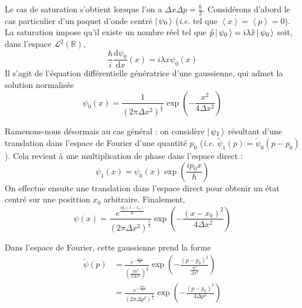         Le cas de saturation s’obtient lorsque l’on a $\Delta x \Delta p = \frac{\hbar}{2}$. Considérons d’abord le cas particulier d’un paquet d’onde centré $\left| \, \psi_0 \, \right>$ (\textit{i.e.} tel que $\left<x\right> = \left<p\right> = 0$). La saturation impose qu’il existe un nombre réel tel que $\hat{p} \left| \, \psi_0 \, \right> = i \lambda \hat{x} \left| \, \psi_0 \, \right>$ soit, dans l’espace $\mathcal{L}^2(\mathbb{R})$, 
        \[ \frac{\hbar}{i} \frac{\text{d} \psi_0}{\text{d}x}(x) = i \lambda x \psi_0(x) \] 
        Il s’agit de l’équation différentielle génératrice d’une gaussienne, qui admet la solution normalisée 
        \[ \psi_0(x) = \frac{1}{\left(2 \pi \Delta x^2\right)^{\frac{1}{4}}} \exp\left(-\frac{x^2}{4 \Delta x^2}\right) \]  
        
        Ramenons-nous désormais au cas général : on considère $\left| \, \psi_1 \, \right>$ résultant d’une translation dans l’espace de Fourier d’une quantité $p_0$ (\textit{i.e.} $\tilde{\psi}_1(p) = \tilde{\psi}_0(p - p_0)$). Cela revient à une multiplication de phase dans l’espace direct : 
        \[ \psi_1(x) = \psi_0(x) \exp\left(\frac{i p_0 x}{\hbar}\right) \]   
        On effectue ensuite une translation dans l’espace direct pour obtenir un état centré sur une posittion $x_0$ arbitraire. Finalement, 
        \[ \psi(x) = \frac{e^{\frac{i p_0 (x - x_0)}{\hbar}}}{\left(2 \pi \Delta x^2\right)^{\frac{1}{4}}} \exp\left(-\frac{(x - x_0)^2}{4 \Delta x^2}\right) \]

        Dans l’espace de Fourier, cette gaussienne prend la forme 
        \begin{align*}
            \tilde{\psi}(p) &= \frac{e^{-\frac{i p x_0}{\hbar}}}{\left(\frac{\pi \hbar^2}{2 \Delta x^2}\right)^{\frac{1}{4}}} \exp\left(-\frac{(p - p_0)^2}{\frac{\hbar^2}{\Delta x^2}}\right) \\
            &= \frac{e^{-\frac{i p x_0}{\hbar}}}{\left(2 \pi \Delta p^2\right)^{\frac{1}{4}}} \exp\left(-\frac{(p - p_0)^2}{4 \Delta p^2}\right)
        \end{align*}

